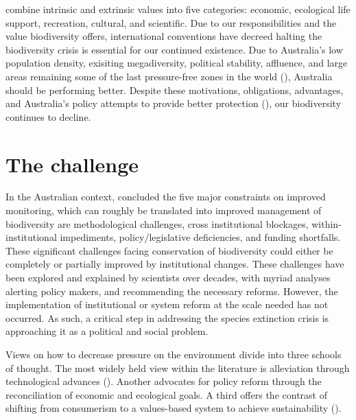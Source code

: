 \documentclass[paper=a4, fontsize=12pt]{article}
\begin{document}
\cite{morton_biodiversity_2014} combine intrinsic and extrinsic values into five categories: economic, ecological life support, recreation, cultural, and scientific. Due to our responsibilities and the value biodiversity offers, international conventions have decreed halting the biodiversity crisis is essential for our continued existence. Due to Australia's low population density, exisiting megadiversity, political stability, affluence, and large areas remaining some of the last pressure-free zones in the world (\cite{venter_sixteen_2016}), Australia should be performing better. Despite these motivations, obligations, advantages, and Australia's policy attempts to provide better protection (\cite{ward_lots_2019}), our biodiversity continues to decline.

\section{The challenge}
In the Australian context, \cite{legge_monitoring_2018} concluded the five major constraints on improved monitoring, which can roughly be translated into improved management of biodiversity are methodological challenges, cross institutional blockages, within-institutional impediments, policy/legislative deficiencies, and funding shortfalls. These significant challenges facing conservation of biodiversity could either be completely or partially improved by institutional changes. These challenges have been explored and explained by scientists over decades, with myriad analyses alerting policy makers, and recommending the necessary reforms. However, the implementation of institutional or system reform at the scale needed has not occurred. As such, a critical step in addressing the species extinction crisis is approaching it as a political and social problem. 

Views on how to decrease pressure on the environment divide into three schools of thought. The most widely held view within the literature is alleviation through technological advances (\cite{alexander_critique_2018}). Another advocates for policy reform through the reconciliation of economic and ecological goals. A third offers the contrast of shifting from consumerism to a values-based system to achieve sustainability (\cite{hatfield-dodds_australia_2015}). 

\end{document}
